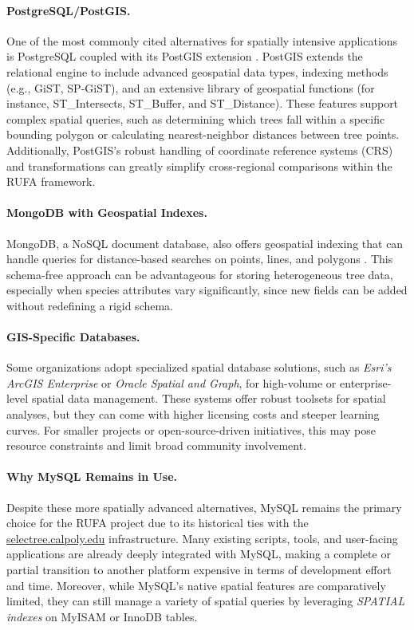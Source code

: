 \paragraph{PostgreSQL/PostGIS.} One of the most commonly cited alternatives for spatially intensive applications is PostgreSQL coupled with its PostGIS extension \cite{postgis2005}. PostGIS extends the relational engine to include advanced geospatial data types, indexing methods (e.g., GiST, SP-GiST), and an extensive library of geospatial functions (for instance, ST\_Intersects, ST\_Buffer, and ST\_Distance). These features support complex spatial queries, such as determining which trees fall within a specific bounding polygon or calculating nearest-neighbor distances between tree points. Additionally, PostGIS’s robust handling of coordinate reference systems (CRS) and transformations can greatly simplify cross-regional comparisons within the RUFA framework.

\paragraph{MongoDB with Geospatial Indexes.} MongoDB, a NoSQL document database, also offers geospatial indexing that can handle queries for distance-based searches on points, lines, and polygons \cite{cattell2011}. This schema-free approach can be advantageous for storing heterogeneous tree data, especially when species attributes vary significantly, since new fields can be added without redefining a rigid schema.

\paragraph{GIS-Specific Databases.} Some organizations adopt specialized spatial database solutions, such as \textit{Esri’s ArcGIS Enterprise} or \textit{Oracle Spatial and Graph}, for high-volume or enterprise-level spatial data management. These systems offer robust toolsets for spatial analyses, but they can come with higher licensing costs and steeper learning curves. For smaller projects or open-source-driven initiatives, this may pose resource constraints and limit broad community involvement.

\paragraph{Why MySQL Remains in Use.} Despite these more spatially advanced alternatives, MySQL remains the primary choice for the RUFA project due to its historical ties with the \href{https://selectree.calpoly.edu}{selectree.calpoly.edu} infrastructure. Many existing scripts, tools, and user-facing applications are already deeply integrated with MySQL, making a complete or partial transition to another platform expensive in terms of development effort and time. Moreover, while MySQL’s native spatial features are comparatively limited, they can still manage a variety of spatial queries by leveraging \textit{SPATIAL indexes} on MyISAM or InnoDB tables.


